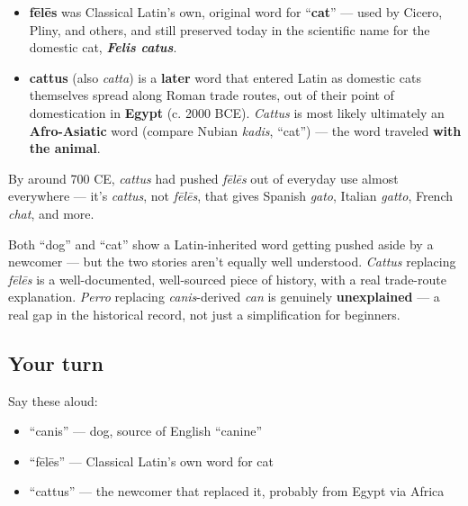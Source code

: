 \begin{itemize}
\raggedright
  \item \textbf{fēlēs} was Classical Latin's own, original word for \textquotedblleft{}\textbf{cat}\textquotedblright{} — used by Cicero, Pliny, and others, and still preserved today in the scientific name for the domestic cat, \emph{\textbf{Felis catus}}.
  \item \textbf{cattus} (also \emph{catta}) is a \textbf{later} word that entered Latin as domestic cats themselves spread along Roman trade routes, out of their point of domestication in \textbf{Egypt} (c. 2000 BCE). \emph{Cattus} is most likely ultimately an \textbf{Afro-Asiatic} word (compare Nubian \emph{kadis}, \textquotedblleft{}cat\textquotedblright{}) — the word traveled \textbf{with the animal}.
\end{itemize}

By around 700 CE, \emph{cattus} had pushed \emph{fēlēs} out of everyday use almost everywhere — it's \emph{cattus}, not \emph{fēlēs}, that gives Spanish \emph{gato}, Italian \emph{gatto}, French \emph{chat}, and more.

\begin{culture}
Both \textquotedblleft{}dog\textquotedblright{} and \textquotedblleft{}cat\textquotedblright{} show a Latin-inherited word getting pushed aside by a newcomer — but the two stories aren't equally well understood. \emph{Cattus} replacing \emph{fēlēs} is a well-documented, well-sourced piece of history, with a real trade-route explanation. \emph{Perro} replacing \emph{canis}-derived \emph{can} is genuinely \textbf{unexplained} — a real gap in the historical record, not just a simplification for beginners.
\end{culture}

\subsection*{Your turn}
Say these aloud:

\begin{itemize}
\raggedright
  \item \textquotedblleft{}canis\textquotedblright{} — dog, source of English \textquotedblleft{}canine\textquotedblright{}
  \item \textquotedblleft{}fēlēs\textquotedblright{} — Classical Latin's own word for cat
  \item \textquotedblleft{}cattus\textquotedblright{} — the newcomer that replaced it, probably from Egypt via Africa
\end{itemize}

